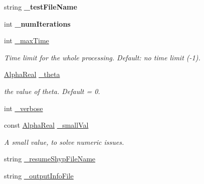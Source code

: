\begin{DoxyCompactItemize}
\item 
\hypertarget{classMultiBoost_1_1AdaBoostMHLearner_ad60eebad3afb84852f5bd8da314aa7fd}{string {\bfseries \-\_\-test\-File\-Name}}\label{classMultiBoost_1_1AdaBoostMHLearner_ad60eebad3afb84852f5bd8da314aa7fd}

\item 
\hypertarget{classMultiBoost_1_1AdaBoostMHLearner_a48db1d5b62055b631970d012f1e4656a}{int {\bfseries \-\_\-num\-Iterations}}\label{classMultiBoost_1_1AdaBoostMHLearner_a48db1d5b62055b631970d012f1e4656a}

\item 
\hypertarget{classMultiBoost_1_1AdaBoostMHLearner_a63d50b131c8e71523def6498213e0b50}{int \hyperlink{classMultiBoost_1_1AdaBoostMHLearner_a63d50b131c8e71523def6498213e0b50}{\-\_\-max\-Time}}\label{classMultiBoost_1_1AdaBoostMHLearner_a63d50b131c8e71523def6498213e0b50}

\begin{DoxyCompactList}\small\item\em Time limit for the whole processing. Default\-: no time limit (-\/1). \end{DoxyCompactList}\item 
\hypertarget{classMultiBoost_1_1AdaBoostMHLearner_a1dcf72e78dd6906d9500bda15efaaa5a}{\hyperlink{Defaults_8h_a80184c4fd10ab70a1a17c5f97dcd1563}{Alpha\-Real} \hyperlink{classMultiBoost_1_1AdaBoostMHLearner_a1dcf72e78dd6906d9500bda15efaaa5a}{\-\_\-theta}}\label{classMultiBoost_1_1AdaBoostMHLearner_a1dcf72e78dd6906d9500bda15efaaa5a}

\begin{DoxyCompactList}\small\item\em the value of theta. Default = 0. \end{DoxyCompactList}\item 
int \hyperlink{classMultiBoost_1_1AdaBoostMHLearner_a03f43502f6ffe9873dc383cc75cfa13d}{\-\_\-verbose}
\item 
\hypertarget{classMultiBoost_1_1AdaBoostMHLearner_ae2bd1ab538ad83c3f101945e36dc67b6}{const \hyperlink{Defaults_8h_a80184c4fd10ab70a1a17c5f97dcd1563}{Alpha\-Real} \hyperlink{classMultiBoost_1_1AdaBoostMHLearner_ae2bd1ab538ad83c3f101945e36dc67b6}{\-\_\-small\-Val}}\label{classMultiBoost_1_1AdaBoostMHLearner_ae2bd1ab538ad83c3f101945e36dc67b6}

\begin{DoxyCompactList}\small\item\em A small value, to solve numeric issues. \end{DoxyCompactList}\item 
string \hyperlink{classMultiBoost_1_1AdaBoostMHLearner_a2e6988a496276d32439f95970144c95c}{\-\_\-resume\-Shyp\-File\-Name}
\item 
\hypertarget{classMultiBoost_1_1AdaBoostMHLearner_aa122d670c3f294eee04620ef1baf15c7}{string \hyperlink{classMultiBoost_1_1AdaBoostMHLearner_aa122d670c3f294eee04620ef1baf15c7}{\-\_\-output\-Info\-File}}\label{classMultiBoost_1_1AdaBoostMHLearner_aa122d670c3f294eee04620ef1baf15c7}


\end{DoxyCompactItemize}
